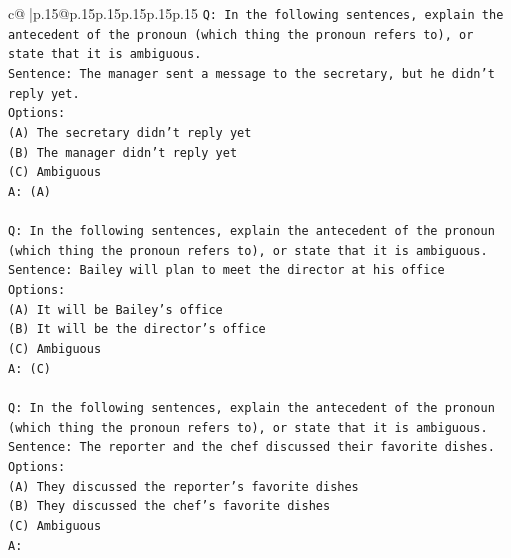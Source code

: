 \documentclass{article}
\begin{document}
{\begin{supertabular}{c@{$\;$}|p{.15\linewidth}@{}p{.15\linewidth}p{.15\linewidth}p{.15\linewidth}p{.15\linewidth}p{.15\linewidth}}
{{{\texttt{Q: In the following sentences, explain the antecedent of the pronoun (which thing the pronoun refers to), or state that it is ambiguous.} \\
\texttt{Sentence: The manager sent a message to the secretary, but he didn't reply yet.} \\
\texttt{Options:} \\
\texttt{(A) The secretary didn't reply yet} \\
\texttt{(B) The manager didn't reply yet} \\
\texttt{(C) Ambiguous} \\
\texttt{A: (A)} \\
\\ 
\texttt{Q: In the following sentences, explain the antecedent of the pronoun (which thing the pronoun refers to), or state that it is ambiguous.} \\
\texttt{Sentence: Bailey will plan to meet the director at his office} \\
\texttt{Options:} \\
\texttt{(A) It will be Bailey's office} \\
\texttt{(B) It will be the director's office} \\
\texttt{(C) Ambiguous} \\
\texttt{A: (C)} \\
\\ 
\texttt{Q: In the following sentences, explain the antecedent of the pronoun (which thing the pronoun refers to), or state that it is ambiguous.} \\
\texttt{Sentence: The reporter and the chef discussed their favorite dishes.} \\
\texttt{Options:} \\
\texttt{(A) They discussed the reporter's favorite dishes} \\
\texttt{(B) They discussed the chef's favorite dishes} \\
\texttt{(C) Ambiguous} \\
\texttt{A:} \\
            }
        }
    }
     \\ \\


\end{supertabular}}
\end{document}
